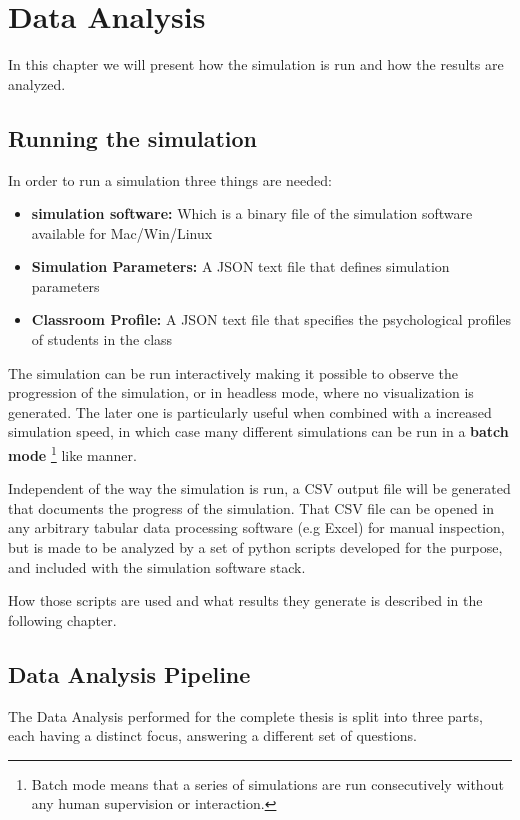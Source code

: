 \chapter{Data Analysis}
\label{Chapter:DataAnalysis}
In this chapter we will present how the simulation is run and how the results are analyzed.

\section{Running the simulation}
In order to run a simulation three things are needed:

\begin{itemize}
    \item \textbf{simulation software:} Which is a binary file of the simulation software available for Mac/Win/Linux
    \item \textbf{Simulation Parameters:} A JSON text file that defines simulation parameters
    \item \textbf{Classroom Profile:} A JSON text file that specifies the psychological profiles of students in the class
\end{itemize}

The simulation can be run interactively making it possible to observe the progression
of the simulation, or in headless mode, where no visualization is generated.
The later one is particularly useful when combined with a increased simulation
speed, in which case many different simulations can be run in a \textbf{batch mode}
\footnote{Batch mode means that a series of simulations are run consecutively without
any human supervision or interaction.} like manner.

\bb

Independent of the way the simulation is run, a CSV output file will be generated that
documents the progress of the simulation. That CSV file can be opened in any
arbitrary tabular data processing software (e.g Excel) for manual inspection, but
is made to be analyzed by a set of python scripts developed for the purpose, and
included with the simulation software stack.

How those scripts are used and what results they generate is described in the following chapter.

\section{Data Analysis Pipeline}
The Data Analysis performed for the complete thesis is split into three parts, each 
having a distinct focus, answering a different set of questions.

